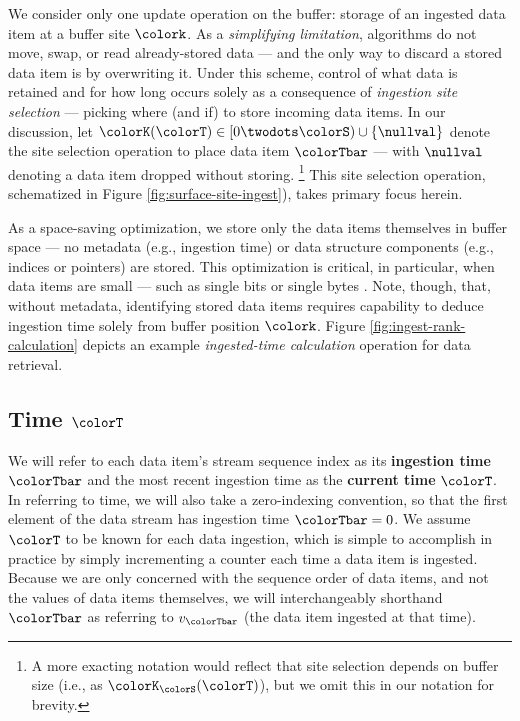 We consider only one update operation on the buffer: storage of an ingested data item at a buffer site $\colork$.
As a \textit{simplifying limitation}, algorithms do not move, swap, or read already-stored data --- and the only way to discard a stored data item is by overwriting it.
Under this scheme, control of what data is retained and for how long occurs solely as a consequence of \textit{ingestion site selection} --- picking where (and if) to store incoming data items.
In our discussion, let $\colorK(\colorT) \in [0\twodots\colorS)\cup\{\nullval\}$ denote the site selection operation to place data item $\colorTbar$ --- with $\nullval$ denoting a data item dropped without storing.%
\footnote{%
A more exacting notation would reflect that site selection depends on buffer size (i.e., as $\colorK_{\colorS}(\colorT)$), but we omit this in our notation for brevity.
}
This site selection operation, schematized in Figure \ref{fig:surface-site-ingest}), takes primary focus herein.

As a space-saving optimization, we store only the data items themselves in buffer space --- no metadata (e.g., ingestion time) or data structure components (e.g., indices or pointers) are stored.
This optimization is critical, in particular, when data items are small --- such as single bits or single bytes \citep{moreno2022hereditary}.
Note, though, that, without metadata, identifying stored data items requires capability to deduce ingestion time solely from buffer position $\colork$.
Figure \ref{fig:ingest-rank-calculation} depicts an example \textit{ingested-time calculation} operation for data retrieval.

\subsection{Time $\colorT$}
\label{sec:notation-time}

We will refer to each data item's stream sequence index as its \textbf{ingestion time} $\colorTbar$ and the most recent ingestion time as the \textbf{current time} $\colorT$.
In referring to time, we will also take a zero-indexing convention, so that the first element of the data stream has ingestion time $\colorTbar=0$.
We assume $\colorT$ to be known for each data ingestion, which is simple to accomplish in practice by simply incrementing a counter each time a data item is ingested.
Because we are only concerned with the sequence order of data items, and not the values of data items themselves, we will interchangeably shorthand $\colorTbar$ as referring to $v_{\colorTbar}$ (the data item ingested at that time).

